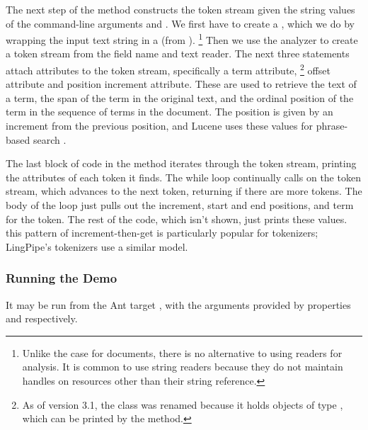 The next step of the  method constructs the token stream
given the string values of the command-line arguments 
and .  
%
%
We first have to create a , which we do by wrapping the
input text string in a  (from ).%
%
\footnote{Unlike the case for documents, there is no alternative to
  using readers for analysis.  It is common to use string readers
  because they do not maintain handles on resources other than their
  string reference.}
%
Then we use the analyzer to create a token stream from the field name
and text reader.  The next three statements attach attributes to the
token stream, specifically a term attribute,%
%
\footnote{As of version 3.1, the  class was
  renamed  because it holds objects of type
 , which can be printed by the 
  method.}
%
offset attribute and
position increment attribute.  These are used to retrieve the text of
a term, the span of the term in the original text, and the ordinal
position of the term in the sequence of terms in the document.  The
position is given by an increment from the previous position, and
Lucene uses these values for phrase-based search .

The last block of code in the  method iterates through
the token stream, printing the attributes of each token it finds.
%
%
The while loop continually calls  on the token
stream, which advances to the next token, returning  if
there are more tokens.  The body of the loop just pulls out the
increment, start and end positions, and term for the token.  The rest
of the code, which isn't shown, just prints these values.  this
pattern of increment-then-get is particularly popular for tokenizers;
LingPipe's tokenizers use a similar model.  

\subsubsection{Running the Demo}

It may be run from the Ant target , with
the arguments provided by properties  and 
 respectively.

